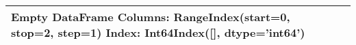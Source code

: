 \begin{tabular}{ll}
\toprule
Empty DataFrame
Columns: RangeIndex(start=0, stop=2, step=1)
Index: Int64Index([], dtype='int64') \\
\bottomrule
\end{tabular}
